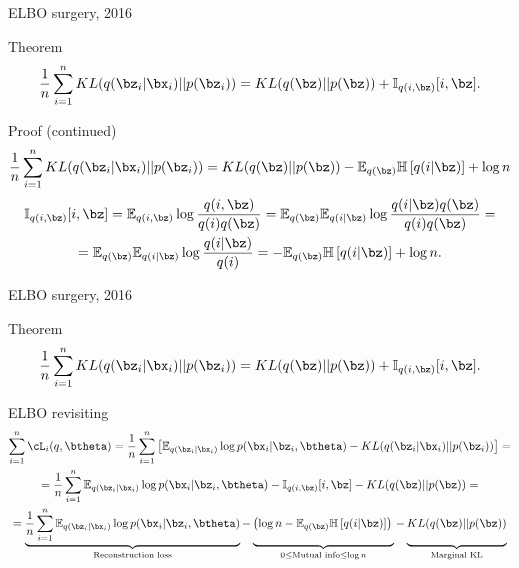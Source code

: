 \begin{frame}{ELBO surgery, 2016}
	\begin{block}{Theorem}
	\[
	    \frac{1}{n} \sum_{i=1}^n KL(q(\bz_i | \bx_i) || p(\bz_i)) = KL(q(\bz) || p(\bz)) + \mathbb{I}_{q(i, \bz)} [i, \bz].
	\]
	\end{block}
	\begin{block}{Proof (continued)}
	{\footnotesize
	\[
	    \frac{1}{n} \sum_{i=1}^n KL(q(\bz_i | \bx_i) || p(\bz_i)) = KL (q(\bz) || p(\bz)) - \mathbb{E}_{q(\bz)} \mathbb{H} \left[q(i | \bz) \right] + \log n
	\]
	\begin{multline*}
	    \mathbb{I}_{q(i, \bz)} [i, \bz] = \mathbb{E}_{q(i, \bz)} \log \frac{q(i, \bz)}{q(i)q(\bz)} = \mathbb{E}_{q(\bz)} \mathbb{E}_{q(i | \bz)} \log \frac{q(i | \bz) q(\bz)}{q(i)q(\bz)} = \\
	    = \mathbb{E}_{q(\bz)} \mathbb{E}_{q(i | \bz)} \log \frac{q(i | \bz)}{q(i)} = - \mathbb{E}_{q(\bz)} \mathbb{H} \left[ q(i | \bz) \right] + \log n.
	\end{multline*}
	}
	\end{block}

\end{frame}
\begin{frame}{ELBO surgery, 2016}
	\begin{block}{Theorem}
	\[
	    \frac{1}{n} \sum_{i=1}^n KL(q(\bz_i | \bx_i) || p(\bz_i)) = KL(q(\bz) || p(\bz)) + \mathbb{I}_{q(i, \bz)} [i, \bz].
	\]
	\end{block}
	\begin{block}{ELBO revisiting}
	{\footnotesize
	\begin{multline*}
	    \sum_{i=1}^n \cL_i(q, \btheta) = \frac{1}{n} \sum_{i=1}^n \left[ \mathbb{E}_{q(\bz_i | \bx_i)} \log p(\bx_i | \bz_i, \btheta) - KL(q(\bz_i | \bx_i) || p(\bz_i)) \right] = \\
	    = \frac{1}{n} \sum_{i=1}^n \mathbb{E}_{q(\bz_i | \bx_i)} \log p(\bx_i | \bz_i, \btheta) - \mathbb{I}_{q(i, \bz)} [i, \bz] - KL(q(\bz) || p(\bz)) = \\
	    = \underbrace{\frac{1}{n} \sum_{i=1}^n \mathbb{E}_{q(\bz_i | \bx_i)} \log p(\bx_i | \bz_i, \btheta)}_{\text{Reconstruction loss}} - \underbrace{\left(\log n - \mathbb{E}_{q(\bz)} \mathbb{H} \left[ q(i | \bz) \right] \right)\vphantom{\sum_{i=1}} }_{0 \leq \text{Mutual info} \leq \log n } - \underbrace{KL(q(\bz) || p(\bz))\vphantom{\sum_{i=1}}}_{\text{Marginal KL}}
	\end{multline*}
	}
	\end{block}

\end{frame}
